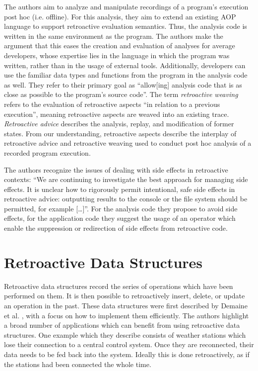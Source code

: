 The authors aim to analyze and manipulate recordings of a program's execution
post hoc (i.e. offline). For this analysis, they aim to extend an existing AOP 
language to support retroactive evaluation semantics.
Thus, the analysis code is written in the same environment as the program. 
The authors make the argument that this eases the creation and evaluation of 
analyses for average developers, whose expertise lies in the language in which 
the program was written, rather than in the usage of external tools.
Additionally, developers can use the familiar data types and functions from the 
program in the analysis code as well.
They refer to their primary goal as ``allow[ing] analysis code that is as close
as possible to the program's source code''. 
The term \emph{retroactive weaving} refers to the evaluation of retroactive 
aspects ``in relation to a previous execution'', meaning retroactive aspects 
are weaved into an existing trace.
\emph{Retroactive advice} describes the analysis, replay, and modification of 
former states.
%
From our understanding, retroactive aspects describe the interplay of 
retroactive advice and retroactive weaving used to conduct post hoc analysis of 
a recorded program execution.  

The authors recognize the issues of dealing with side effects in retroactive 
contexts: ``We are continuing to investigate the best approach for managing side 
effects. It is unclear how to rigorously permit intentional, safe side effects 
in retroactive advice: outputting results to the console or the file system 
should be permitted, for example [\dots]''. For the analysis code they propose 
to avoid side effects, for the application code they suggest the usage of an 
operator which enable the suppression or redirection of side effects from 
retroactive code.


\section{Retroactive Data Structures}
Retroactive data structures record the series of operations which have been
performed on them. It is then possible to retroactively insert, delete, or
update an operation in the past.
These data structures were first described by Demaine et al. \cite{Demaine2007},
with a focus on how to implement them efficiently. The authors highlight a broad 
number of applications which can benefit from using retroactive data structures. 
One example which they describe consists of weather stations which lose their 
connection to a central control system. Once they are reconnected, their data 
needs to be fed back into the system. Ideally this is done retroactively, as if 
the stations had been connected the whole time. 

